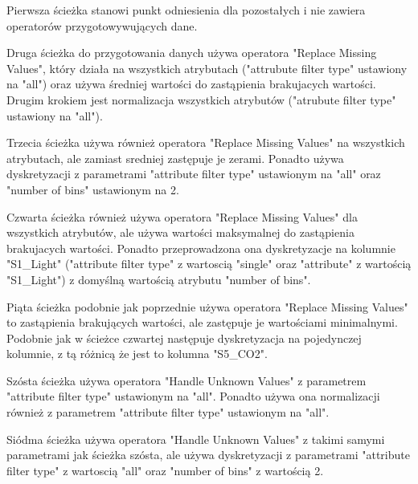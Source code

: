 \documentclass[12pt,oneside,a4paper]{book} %
\theoremstyle{break}
\begin{document}
Pierwsza ścieżka stanowi punkt odniesienia dla pozostałych i nie zawiera operatorów przygotowywujących dane.

Druga ścieżka do przygotowania danych używa operatora "Replace Missing Values", który działa na wszystkich atrybutach ("attrubute filter type" ustawiony na "all") oraz używa średniej wartości do zastąpienia brakujacych wartości. Drugim krokiem jest normalizacja wszystkich atrybutów ("atrubute filter type" ustawiony na "all").

Trzecia ścieżka używa również operatora "Replace Missing Values" na wszystkich atrybutach, ale zamiast sredniej zastępuje je zerami. Ponadto używa dyskretyzacji z parametrami "attribute filter type" ustawionym na "all" oraz "number of bins" ustawionym na 2.

Czwarta ścieżka również używa operatora "Replace Missing Values" dla wszystkich atrybutów, ale używa wartości maksymalnej do zastąpienia brakujacych wartości.
Ponadto przeprowadzona ona dyskretyzacje na kolumnie "S1\_Light" ("attribute filter type" z wartoscią "single" oraz "attribute" z wartością "S1\_Light") z domyślną wartością atrybutu "number of bins".

Piąta ścieżka podobnie jak poprzednie używa operatora "Replace Missing Values" to zastąpienia brakujących wartości, ale zastępuje je wartościami minimalnymi. Podobnie jak w ścieżce czwartej następuje dyskretyzacja na pojedynczej kolumnie, z tą różnicą że jest to kolumna "S5\_CO2".

Szósta ścieżka używa operatora "Handle Unknown Values" z parametrem "attribute filter type" ustawionym na "all". Ponadto używa ona normalizacji również z parametrem "attribute filter type" ustawionym na "all".

Siódma ścieżka używa operatora "Handle Unknown Values" z takimi samymi parametrami jak ścieżka szósta, ale używa dyskretyzacji z parametrami "attribute filter type" z wartoscią "all" oraz "number of bins" z wartością 2.
\end{document}
